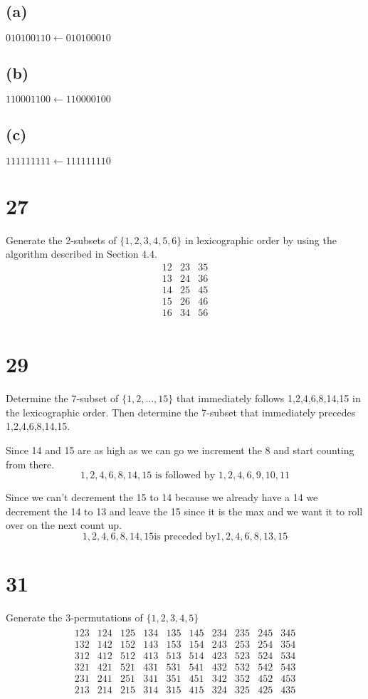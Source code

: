 \documentclass{article}
\begin{document}
\subsection*{(a)}
$010100110\gets010100010$
\subsection*{(b)}
$110001100\gets110000100$
\subsection*{(c)}
$111111111\gets111111110$
\section*{27}
Generate the 2-subsets of $\{1,2,3,4,5,6\}$ in lexicographic order by using the algorithm described in Section 4.4.
\[\begin{array}{ccc}
  12&23&35\\
  13&24&36\\
  14&25&45\\
  15&26&46\\
  16&34&56\\
\end{array}\]
\section*{29}
Determine the 7-subset of $\{1,2,\dots,15\}$ that immediately follows 1,2,4,6,8,14,15 in the lexicographic order. Then determine the 7-subset that immediately precedes 1,2,4,6,8,14,15.

Since 14 and 15 are as high as we can go we increment the 8 and start counting from there.
\[1,2,4,6,8,14,15\text{ is followed by }1,2,4,6,9,10,11\]

Since we can't decrement the 15 to 14 because we already have a 14 we decrement the 14 to 13 and leave the 15 since it is the max and we want it to roll over on the next count up.
\[1,2,4,6,8,14,15\text{is preceded by}1,2,4,6,8,13,15\]

\section*{31}
Generate the 3-permutations of $\{1,2,3,4,5\}$
\begin{align*}
  \begin{array}{cccccccccc}
    123&124&125&134&135&145&234&235&245&345\\
    132&142&152&143&153&154&243&253&254&354\\
    312&412&512&413&513&514&423&523&524&534\\
    321&421&521&431&531&541&432&532&542&543\\
    231&241&251&341&351&451&342&352&452&453\\
    213&214&215&314&315&415&324&325&425&435\\
  \end{array}
\end{align*}
\end{document}
